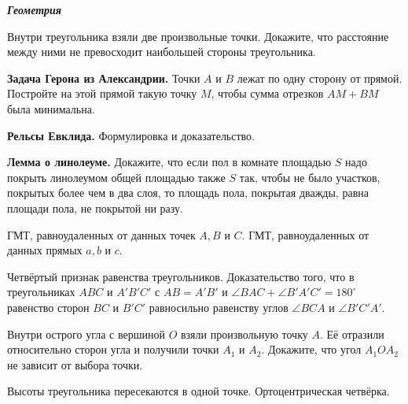 \begin{center}
\textbf{\textit{Геометрия}}
\end{center}
\begin{problems}
\item Внутри треугольника взяли две произвольные точки. Докажите, что расстояние между ними не превосходит наибольшей стороны треугольника.

\item \textbf{Задача Герона из Александрии.} Точки $A$ и $B$ лежат по одну сторону от прямой. Постройте на этой прямой такую точку $M$, чтобы сумма отрезков $AM+BM$ была минимальна. 

\item \textbf{Рельсы Евклида.} Формулировка и доказательство.

\item \textbf{Лемма о линолеуме.} Докажите, что если пол в комнате площадью $S$ надо покрыть линолеумом общей площадью также $S$ так, чтобы не было участков, покрытых более чем в два слоя, то площадь пола, покрытая дважды, равна площади пола, не покрытой ни разу. 

\item ГМТ, равноудаленных от данных точек $A,B$ и $C$. ГМТ, равноудаленных от данных прямых $a, b$ и $c$.

\item Четвёртый признак равенства треугольников. Доказательство того, что в треугольниках $ABC$ и $A'B'C'$ с $AB=A'B'$ и $\angle BAC+\angle B'A'C'=180^{\circ}$ равенство сторон $BC$ и $B'C'$ равносильно равенству углов $\angle BCA$ и $\angle B'C'A'$.

\item Внутри острого угла с вершиной $O$ взяли произвольную точку $A$. Её отразили относительно сторон угла и получили точки $A_1$ и $A_2$. Докажите, что угол $A_1OA_2$ не зависит от выбора точки.

\item Высоты треугольника пересекаются в одной точке. Ортоцентрическая четвёрка.
\end{problems}

\resetproblem

